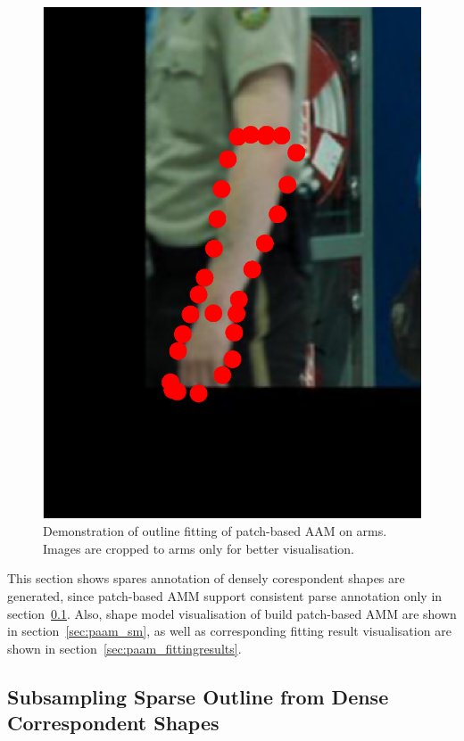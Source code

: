\begin{figure}[!t]
    \includegraphics[height=\ofh]{Suplementory_Meterial/ExFit/0044.eps}
    \caption{Demonstration of outline fitting of patch-based AAM on arms. Images are cropped to arms only for better visualisation.}
    \label{fig:paam_fittingresults}
\end{figure}

This section shows spares annotation of densely corespondent shapes are generated, since patch-based AMM support consistent parse annotation only in section~\ref{sec:sparsesample}. Also, shape model visualisation of build patch-based AMM are shown in section~\ref{sec:paam_sm}, as well as corresponding fitting result visualisation are shown in section~\ref{sec:paam_fittingresults}.


\subsection{Subsampling Sparse Outline from Dense Correspondent Shapes}
\label{sec:sparsesample}

